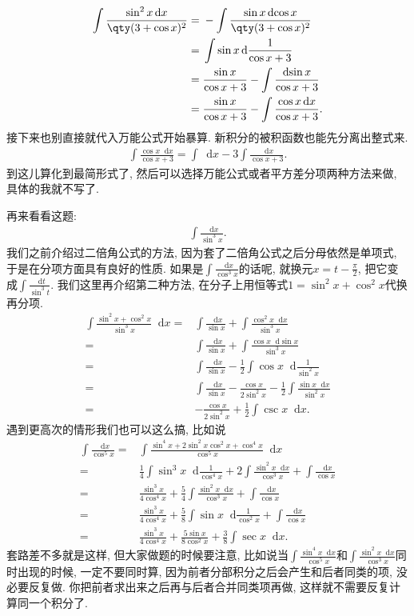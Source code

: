 \documentclass{ctexbook}
\newcommand*{\dif}{\mathop{}\!\mathrm{d}}
\begin{document}
{\begin{align*}
\int\frac{\sin^{2}{x}\dif{x}}{\qty(3+\cos{x})^{2}}={}&-\int\frac{\sin{x}\dif{\cos{x}}}{\qty(3+\cos{x})^{2}}\\
={}&\int\sin{x}\dif{\frac{1}{\cos{x}+3}}\\
={}&\frac{\sin{x}}{\cos{x}+3}-\int\frac{\dif{\sin{x}}}{\cos{x}+3}\\
={}&\frac{\sin{x}}{\cos{x}+3}-\int\frac{\cos{x}\dif{x}}{\cos{x}+3}
.\end{align*}
接下来也别直接就代入万能公式开始暴算. 新积分的被积函数也能先分离出整式来. 
\begin{align*}
\int\frac{\cos{x}\dif{x}}{\cos{x}+3}=\int\dif{x}-3\int\frac{\dif{x}}{\cos{x}+3}
.\end{align*}
到这儿算化到最简形式了, 然后可以选择万能公式或者平方差分项两种方法来做, 具体的我就不写了. \par
再来看看这题: 
\begin{align*}
\int\frac{\dif{x}}{\sin^{3}{x}}
.\end{align*}
我们之前介绍过二倍角公式的方法, 因为套了二倍角公式之后分母依然是单项式, 于是在分项方面具有良好的性质. 如果是$\int\frac{\dif{x}}{\cos^{3}{x}}$的话呢, 就换元$x=t-\frac{\pi}{2}$, 把它变成$\int\frac{\dif{t}}{\sin^{3}{t}}$. 我们这里再介绍第二种方法, 在分子上用恒等式$1=\sin^{2}{x}+\cos^{2}{x}$代换再分项. 
\begin{align*}
\int\frac{\sin^{2}{x}+\cos^{2}{x}}{\sin^{3}{x}}\dif{x}={}&\int\frac{\dif{x}}{\sin{x}}+\int\frac{\cos^{2}{x}\dif{x}}{\sin^{3}{x}}\\
={}&\int\frac{\dif{x}}{\sin{x}}+\int\frac{\cos{x}\dif{\sin{x}}}{\sin^{3}{x}}\\
={}&\int\frac{\dif{x}}{\sin{x}}-\frac{1}{2}\int\cos{x}\dif{\frac{1}{\sin^{2}{x}}}\\
={}&\int\frac{\dif{x}}{\sin{x}}-\frac{\cos{x}}{2\sin^{2}{x}}-\frac{1}{2}\int\frac{\sin{x}\dif{x}}{\sin^{2}{x}}\\
={}&-\frac{\cos{x}}{2\sin^{2}{x}}+\frac{1}{2}\int\csc{x}\dif{x}
.\end{align*}
遇到更高次的情形我们也可以这么搞, 比如说
\begin{align*}
\int\frac{\dif{x}}{\cos^{5}{x}}={}&\int\frac{\sin^{4}{x}+2\sin^{2}{x}\cos^{2}{x}+\cos^{4}{x}}{\cos^{5}{x}}\dif{x}\\
={}&\frac{1}{4}\int\sin^{3}{x}\dif{\frac{1}{\cos^{4}{x}}}+2\int\frac{\sin^{2}{x}\dif{x}}{\cos^{3}{x}}+\int\frac{\dif{x}}{\cos{x}}\\
={}&\frac{\sin^{3}{x}}{4\cos^{4}{x}}+\frac{5}{4}\int\frac{\sin^{2}{x}\dif{x}}{\cos^{3}{x}}+\int\frac{\dif{x}}{\cos{x}}\\
={}&\frac{\sin^{3}{x}}{4\cos^{4}{x}}+\frac{5}{8}\int\sin{x}\dif{\frac{1}{\cos^{2}{x}}}+\int\frac{\dif{x}}{\cos{x}}\\
={}&\frac{\sin^{3}{x}}{4\cos^{4}{x}}+\frac{5\sin{x}}{8\cos^{2}{x}}+\frac{3}{8}\int\sec{x}\dif{x}
.\end{align*}
套路差不多就是这样, 但大家做题的时候要注意, 比如说当$\int\frac{\sin^{4}{x}\dif{x}}{\cos^{5}{x}}$和$\int\frac{\sin^{2}{x}\dif{x}}{\cos^{3}{x}}$同时出现的时候, 一定不要同时算, 因为前者分部积分之后会产生和后者同类的项, 没必要反复做. 你把前者求出来之后再与后者合并同类项再做, 这样就不需要反复计算同一个积分了. \par
}
\end{document}
